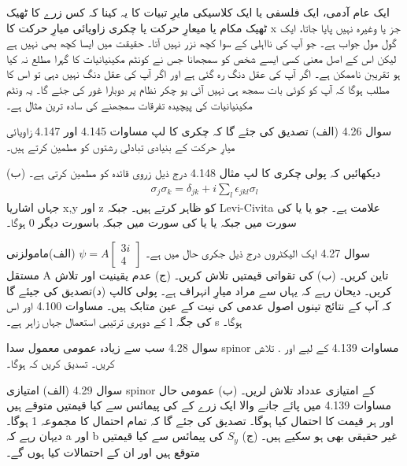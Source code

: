 
ایک عام آدمی، ایک فلسفی یا ایک کلاسیکی مایرِ تبیات کا یہ کینا کہ کس زرے  کا ٹھیک ٹھیک مکام یا میعارِ حرکت یا چکری زاویائی میارِ حرکت کا
x
جز یا وغیرہ نہیں پایا جاتا،  ایک گول مول جواب ہے۔ جو آپ کی نااہلی کے سوا کچھ نزر نہیں آتا۔ حقیقت میں ایسا کچھ بھی نہیں ہے لیکن اس کے اصل معنی کسی ایسے شخص کو سمجھانا جس نے کونٹم مکینیانیات کا گہرا مطلع نہ کیا ہو تقریبن ناممکن ہے۔ اگر آپ کی عقل دنگ رہ گئی ہے اور اگر آپ کی عقل دنگ نہیں دہی تو اس کا مطلب ہوگا کہ آپ کو کوئی بات سمجھ ہی نہیں آئی یو  
چکر نظام پر دوبارا غور کی جئے گا۔ یہ  ونٹم مکینیانیات کی پیچیدہ تفرقات سمجھنے کی سادہ ترین مثال ہے۔

سوال 4.26
(الف) تصدیق کی جئے گا کہ چکری کا لپ مساوات 4.145 اور 4.147 زاویائی میارِ حرکت کے بنیادی تبادلی رشتوں کو مطمین کرتے ہیں۔ 

(ب) دیکھائیں کہ پولی چکری کا لپ  مثال  4.148 درج ذیل زروی قائدہ کو مطمین کرتی ہے۔ 
\begin{align}
\sigma_j\sigma_k = \delta_{jk}+i\sum_l \epsilon_{jkl}\sigma_l
\end{align}
جہاں اشاریا x,y اور z کو ظاہر کرتے ہیں۔ جبکہ  
Levi-Civita
 علامت ہے۔ جو 
یا 
یا  
کی سورت میں 
جبکہ  
یا
یا
کی سورت میں 
جبکہ باسورت دیگر
0
ہوگا۔ 

سوال 
4.27
ایک الیکٹروں درج ذیل جکری حال میں ہے۔
$\psi =A\begin{bmatrix}
3i \\ 4
\end{bmatrix} $
(الف)مامولزنی مستقل A تاین کریں۔
 (ب)  کی تقواتی قیمتیں تلاش کریں۔
 (ج) عدم یقینیت     اور
   تلاش کریں۔ دیحان رہے کہ یہاں  سے مراد میارِ انہراف ہے۔ پولی کالپ 
  (د)تصدیق کی جیئے گا کہ آپ کے نتائج تینوں اصول عدمی کی نیت کے عین متابک ہیں۔ مساوات   4.100 اور اس کے دوہری ترتیبی استعمال جہاں زاہر ہے۔
   l
کی جگہ
   s
   ہوگا۔
   
   سوال  4.28  سب سے زیادہ عمومی معمول سدا spinor    مساوات 4.139  کے لیے 
   اور
   .
 تلاش کریں۔ تسدیق کریں کہ 
 ہوگا۔ 
 
 سوال 
 4.29
 (الف)  امتیازی spinor 
کے امتیازی عدداد تلاش لریں۔
(ب) عمومی حال  مساوات 
4.139
 میں پائے جانے والا ایک زرے کے 
کی پیمائس سے کیا قیمتیں متوقے ہیں اور ہر قیمت کا احتمال کیا ہوگا۔ تصدیق کی جئے گا کہ تمام احتمال کا مجموعہ  1 ہوگا۔ دیہان رہے کہ a اور b غیر حقیقی بھی ہو سکیے ہیں۔  
(ج) $S_y$ کی پیمائس سے کیا قیمتیں متوقع ہیں اور ان کے احتمالات کیا ہوں گے۔ 

